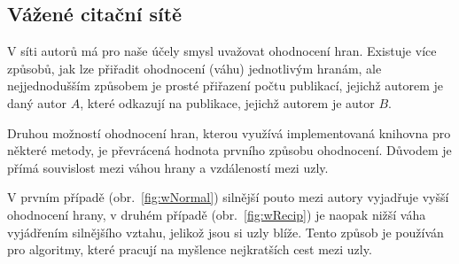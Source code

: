 \documentclass{bakalarka}
\begin{document}
\subsection{Vážené citační sítě}
V síti autorů má pro naše účely smysl uvažovat ohodnocení hran. Existuje více
způsobů, jak lze přiřadit ohodnocení (váhu) jednotlivým hranám, ale
nejjednodušším způsobem je prosté přiřazení počtu publikací, jejichž autorem je
daný autor $A$, které odkazují na publikace, jejichž autorem je autor $B$.

Druhou možností ohodnocení hran, kterou využívá implementovaná knihovna pro
některé metody, je převrácená hodnota prvního způsobu ohodnocení. Důvodem je
přímá souvislost mezi váhou hrany a vzdáleností mezi uzly. 

V prvním případě (obr.~\ref{fig:wNormal}) silnější pouto mezi autory vyjadřuje
vyšší ohodnocení hrany, v druhém případě (obr.~\ref{fig:wRecip}) je naopak
nižší váha vyjádřením silnějšího vztahu, jelikož jsou si uzly blíže.  Tento
způsob je používán pro algoritmy, které pracují na myšlence nejkratších cest
mezi uzly. 
\end{document}
